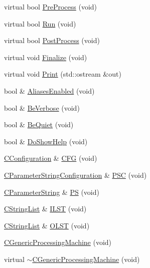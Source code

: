 \begin{DoxyCompactItemize}
\item 
virtual bool \hyperlink{classCGenericProcessingMachine_a041a02c6755571a3586f29726ec5d7ae}{Pre\-Process} (void)
\item 
virtual bool \hyperlink{classCGenericProcessingMachine_ae54e3b9192076c54731df813bdaf0d9f}{Run} (void)
\item 
virtual bool \hyperlink{classCGenericProcessingMachine_a7b3538bad706f116660406c6f69356bc}{Post\-Process} (void)
\item 
virtual void \hyperlink{classCGenericProcessingMachine_ad27835c0cd8f90b8cc896684e764b90c}{Finalize} (void)
\item 
virtual void \hyperlink{classCGenericProcessingMachine_af4f22c7d76e2b9c47f7be9bfd42ce816}{Print} (std\-::ostream \&out)
\item 
bool \& \hyperlink{classCGenericProcessingMachine_a0c90babd4ce87888b7210644d9298ca0}{Aliases\-Enabled} (void)
\item 
bool \& \hyperlink{classCGenericProcessingMachine_a557e9ed9621032fd0cc95ff0ac12a633}{Be\-Verbose} (void)
\item 
bool \& \hyperlink{classCGenericProcessingMachine_ac4995f4884dded47c39a8b104b2bee6f}{Be\-Quiet} (void)
\item 
bool \& \hyperlink{classCGenericProcessingMachine_a8ff379a124172def9369c94567877ca4}{Do\-Show\-Help} (void)
\item 
\hyperlink{classCConfiguration}{C\-Configuration} \& \hyperlink{classCGenericProcessingMachine_a3bfdbdc5634a9d87310670e006e37f14}{C\-F\-G} (void)
\item 
\hyperlink{classCParameterStringConfiguration}{C\-Parameter\-String\-Configuration} \& \hyperlink{classCGenericProcessingMachine_af52c4160fe3a92b36faf42050094dfa6}{P\-S\-C} (void)
\item 
\hyperlink{classCParameterString}{C\-Parameter\-String} \& \hyperlink{classCGenericProcessingMachine_a37e5ee4de1dfd674d7bcd00c23824e6e}{P\-S} (void)
\item 
\hyperlink{classCStringList}{C\-String\-List} \& \hyperlink{classCGenericProcessingMachine_a2edb03a498a4ea859ddf3c96fa6d1c46}{I\-L\-S\-T} (void)
\item 
\hyperlink{classCStringList}{C\-String\-List} \& \hyperlink{classCGenericProcessingMachine_aa7c84522a453d2cf8d7405e88df0ea97}{O\-L\-S\-T} (void)
\item 
\hyperlink{classCGenericProcessingMachine_a77a8cb7b5509acef5db5d2b5b5f5b7f2}{C\-Generic\-Processing\-Machine} (void)
\item 
virtual \hyperlink{classCGenericProcessingMachine_aeb89f8b8fbfca4f8de1e72db9a31f9bd}{$\sim$\-C\-Generic\-Processing\-Machine} (void)
\end{DoxyCompactItemize}
